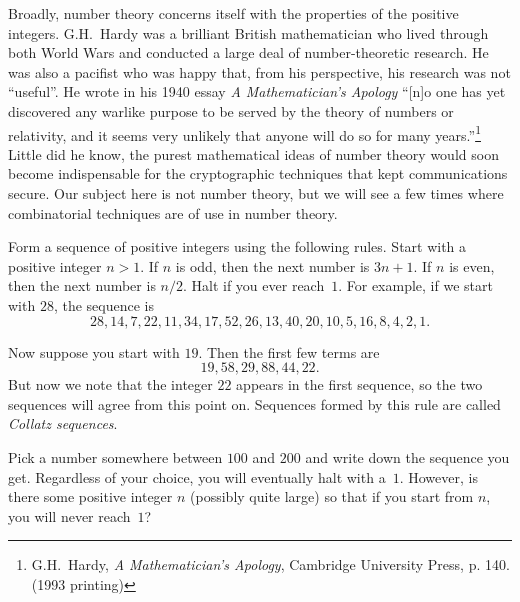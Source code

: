 Broadly, number theory concerns itself with the properties of the
positive integers. G.H.\ Hardy was a brilliant British mathematician
who lived through both World Wars and conducted a large deal of
number-theoretic research. He was also a pacifist who was happy that,
from his perspective, his research was not ``useful''. He wrote in his
1940 essay \emph{A Mathematician's Apology} ``[n]o one has yet
discovered any warlike purpose to be served by the theory of numbers
or relativity, and it seems very unlikely that anyone will do so for
many years.''\footnote{G.H.\ Hardy, \textit{A Mathematician's
    Apology}, Cambridge University Press, p. 140. (1993 printing)}
Little did he know, the purest mathematical ideas of number theory
would soon become indispensable for the cryptographic techniques that
kept communications secure. Our subject here is not number theory, but
we will see a few times where combinatorial techniques are of use in
number theory.

\begin{example}\label{ex:collatz}
Form a sequence of positive integers using the
following rules.  Start with a positive integer $n>1$. If $n$ is odd,
then the next number is $3n+1$.  If $n$ is even, then the
next number is $n/2$.  Halt if you ever reach~$1$.
For example, if we start with $28$, the sequence is
\[
28, 14, 7, 22, 11, 34, 17, 52, 26, 13, 40, 20, 10, 5, 16, 8, 4, 2, 1.
\]

Now suppose you start with $19$.  Then the first few terms are
\[
19, 58, 29, 88, 44, 22.
\]
But now we note that the integer $22$ appears in the first sequence,
so the two sequences will agree from this point on.  Sequences formed
by this rule are called \textit{Collatz sequences}.

Pick a number somewhere between $100$ and $200$ and write down the sequence
you get.  Regardless of your choice, you will eventually halt with a~$1$.
However, is there some positive integer $n$ (possibly quite large) so
that if you start from $n$, you will never reach~$1$?
\end{example}
 
